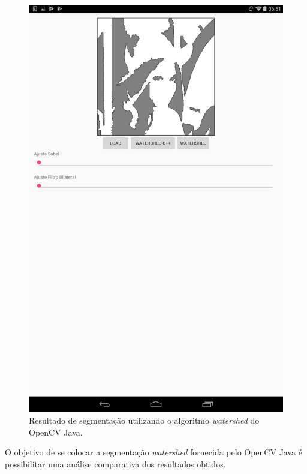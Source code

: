   \begin{figure}[!htb]
       \begin{center}  
          \includegraphics[width=0.3\columnwidth]{img/resultado_watershed_opencv_app.png}
           \caption{\label{fig:resultado_watershed_opencv_app}Resultado de segmentação utilizando o algoritmo \textit{watershed} do OpenCV Java.}
       \end{center}
   \end{figure}

O objetivo de se colocar a segmentação \textit{watershed} fornecida pelo OpenCV Java é possibilitar uma análise comparativa dos resultados obtidos.